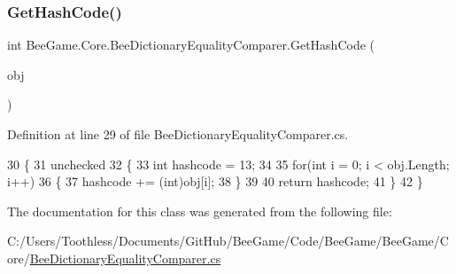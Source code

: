 \subsubsection{\texorpdfstring{Get\+Hash\+Code()}{GetHashCode()}}
{\footnotesize\ttfamily int Bee\+Game.\+Core.\+Bee\+Dictionary\+Equality\+Comparer.\+Get\+Hash\+Code (\begin{DoxyParamCaption}\item[{\hyperlink{namespace_bee_game_1_1_enums_aa2ead984825678d83c42d48f6382619c}{Bee\+Species} \mbox{[}$\,$\mbox{]}}]{obj }\end{DoxyParamCaption})}



Definition at line 29 of file Bee\+Dictionary\+Equality\+Comparer.\+cs.


\begin{DoxyCode}
30         \{
31             unchecked
32             \{
33                 \textcolor{keywordtype}{int} hashcode = 13;
34 
35                 \textcolor{keywordflow}{for}(\textcolor{keywordtype}{int} i = 0; i < obj.Length; i++)
36                 \{
37                     hashcode += (int)obj[i];
38                 \}
39 
40                 \textcolor{keywordflow}{return} hashcode;
41             \}
42         \}
\end{DoxyCode}


The documentation for this class was generated from the following file\+:\begin{DoxyCompactItemize}
\item 
C\+:/\+Users/\+Toothless/\+Documents/\+Git\+Hub/\+Bee\+Game/\+Code/\+Bee\+Game/\+Bee\+Game/\+Core/\hyperlink{_bee_dictionary_equality_comparer_8cs}{Bee\+Dictionary\+Equality\+Comparer.\+cs}\end{DoxyCompactItemize}
